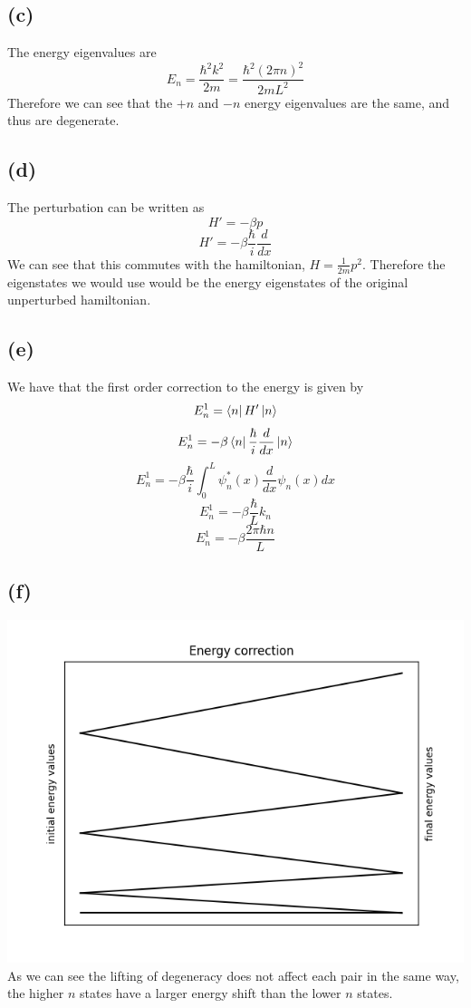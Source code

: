 \documentclass[11pt]{article}
\begin{document}
\subsection*{(c)}
The energy eigenvalues are 
$$E_n = \frac{\hbar^2k^2}{2m} = \frac{\hbar^2(2\pi n)^2}{2mL^2}$$
Therefore we can see that the $+n$ and $-n$ energy eigenvalues are the same, 
and thus are degenerate.
\subsection*{(d)}
The perturbation can be written as 
$$H' = -\beta p$$
$$H' = -\beta \frac{\hbar}{i}\frac{d}{dx}$$
We can see that this commutes with the hamiltonian, $H=\frac{1}{2m}p^2$.
Therefore the eigenstates we would use would be the energy eigenstates of the 
original unperturbed hamiltonian.
\subsection*{(e)}
We have that the first order correction to the energy is given by
$$E_{n}^1 = \bra{n}H'\ket{n}$$
$$E_{n}^1 = -\beta \bra{n}\frac{\hbar}{i}\frac{d}{dx}\ket{n}$$
$$E_{n}^1 = -\beta \frac{\hbar}{i}\int_{0}^{L}\psi_n^*(x)\frac{d}{dx}\psi_n(x)dx$$
$$E_{n}^1 = -\beta \frac{\hbar}{L}k_n$$
$$E_{n}^1 = \boxed{-\beta \frac{2 \pi \hbar n}{L}}$$
\subsection*{(f)}
\includegraphics*[scale=0.5]{2f.png}
As we can see the lifting of degeneracy does not affect each pair in the same way, 
the higher $n$ states have a larger energy shift than the lower $n$ states.
\end{document}
